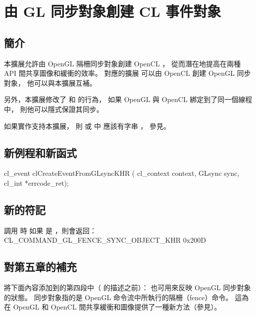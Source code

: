 \section[sec:clEvtObjFromGlSync]{由 GL 同步對象創建 CL 事件對象}

\subsection{簡介}

本擴展允許由 OpenGL 隔柵同步對象創建 OpenCL ，
從而潛在地提高在兩種 API 間共享圖像和緩衝的效率。
對應的擴展  可以由 OpenCL 創建 OpenGL 同步對象，
他可以與本擴展互補。

另外，本擴展修改了  和  的行為，
如果 OpenGL  與 OpenCL  綁定到了同一個線程中，
則他可以隱式保證其同步。

如果實作支持本擴展，
則  或  中
應該有字串 ，
參見。

\subsection{新例程和新函式}

\startCLFUNC
cl_event clCreateEventFromGLsyncKHR (
			cl_context context,
			GLsync sync,
			cl_int *errcode_ret);
\stopCLFUNC

\subsection{新的符記}

調用  時
如果  是 ，則會返回：
\startclc
CL_COMMAND_GL_FENCE_SYNC_OBJECT_KHR	0x200D
\stopclc

\subsection{對第五章的補充}

將下面內容添加到的第四段中（ 的描述之前）：
\startreplacepar
{}也可用來反映 OpenGL 同步對象的狀態。
同步對象指的是 OpenGL 命令流中所執行的隔柵（fence）命令。
這為在 OpenGL 和 OpenCL 間共享緩衝和圖像提供了一種新方法（參見）。
\stopreplacepar

